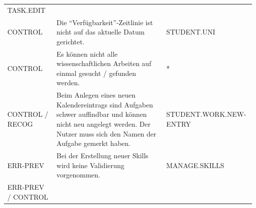 \documentclass[
  12pt,
  ngerman,
  a4paper,
]{article}
\begin{document}
\begin{longtable}[]{@{}lll@{}}
\begin{minipage}[t]{0.27\columnwidth}
TASK.EDIT\strut
\end{minipage}\tabularnewline
\begin{minipage}[t]{0.15\columnwidth}\raggedright
CONTROL\strut
\end{minipage} & \begin{minipage}[t]{0.49\columnwidth}\raggedright
Die ``Verfügbarkeit''-Zeitlinie ist nicht auf das aktuelle Datum
gerichtet.\strut
\end{minipage} & \begin{minipage}[t]{0.27\columnwidth}\raggedright
STUDENT.UNI\strut
\end{minipage}\tabularnewline
\begin{minipage}[t]{0.15\columnwidth}\raggedright
CONTROL\strut
\end{minipage} & \begin{minipage}[t]{0.49\columnwidth}\raggedright
Es können nicht alle wissenschaftlichen Arbeiten auf einmal gesucht /
gefunden werden.\strut
\end{minipage} & \begin{minipage}[t]{0.27\columnwidth}\raggedright
*\strut
\end{minipage}\tabularnewline
\begin{minipage}[t]{0.15\columnwidth}\raggedright
CONTROL / RECOG\strut
\end{minipage} & \begin{minipage}[t]{0.49\columnwidth}\raggedright
Beim Anlegen eines neuen Kalendereintrags sind Aufgaben schwer
auffindbar und können nicht neu angelegt werden. Der Nutzer muss sich
den Namen der Aufgabe gemerkt haben.\strut
\end{minipage} & \begin{minipage}[t]{0.27\columnwidth}\raggedright
STUDENT.WORK.NEW-ENTRY\strut
\end{minipage}\tabularnewline
\begin{minipage}[t]{0.15\columnwidth}\raggedright
ERR-PREV\strut
\end{minipage} & \begin{minipage}[t]{0.49\columnwidth}\raggedright
Bei der Erstellung neuer Skills wird keine Validierung
vorgenommen.\strut
\end{minipage} & \begin{minipage}[t]{0.27\columnwidth}\raggedright
MANAGE.SKILLS\strut
\end{minipage}\tabularnewline
\begin{minipage}[t]{0.15\columnwidth}\raggedright
ERR-PREV / CONTROL\strut
\end{minipage} & \begin{minipage}[t]{0.49\columnwidth}\raggedright

\end{minipage}
\end{longtable}
\end{document}
